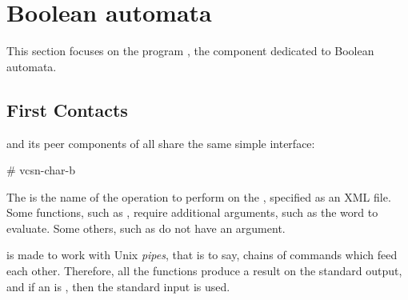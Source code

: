 \newpage

\section{Boolean automata}
\label{sec:vcsn-char-b}

This section focuses on the program , the
\tafkit component dedicated to Boolean automata.

\subsection{First Contacts}

 and its peer components of \tafkit all share the same
simple interface:

\begin{shell}
# vcsn-char-b   
\end{shell}

\noindent
The  is the name of the operation to perform on the
, specified as an XML file.  Some functions, such as
, require additional arguments, such as the word to
evaluate.  Some others, such as  do not have an
 argument.

\tafkit is made to work with Unix \emph{pipes}, that is to say, chains
of commands which feed each other.  Therefore, all the functions
produce a result on the standard output, and if an  is
\samp{-}, then the standard input is used.

\smallskip

